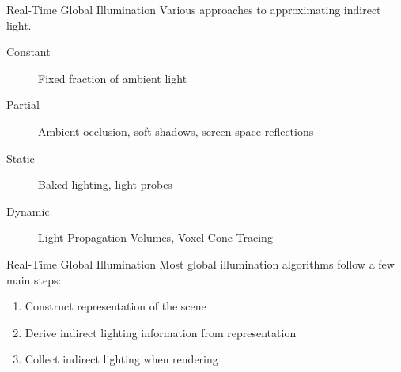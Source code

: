 \documentclass[10pt]{beamer}
\begin{document}
\begin{frame}{Real-Time Global Illumination}
  Various approaches to approximating indirect light.

  \begin{description}
    \item[Constant] Fixed fraction of ambient light %
    \item[Partial] Ambient occlusion, soft shadows, screen space reflections %
    \item[Static] Baked lighting, light probes
    \item[Dynamic] Light Propagation Volumes, Voxel Cone Tracing
  \end{description}
\end{frame}

\begin{frame}{Real-Time Global Illumination}
  Most global illumination algorithms follow a few main steps:

  \begin{enumerate}
    \item Construct representation of the scene
    \item Derive indirect lighting information from representation
    \item Collect indirect lighting when rendering
  \end{enumerate}
\end{frame}
\end{document}

